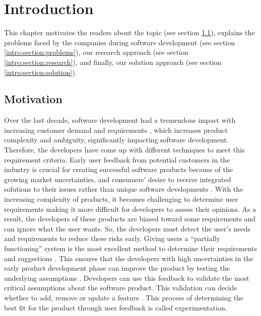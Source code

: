 \chapter{Introduction} \label{chap:intro}
This chapter motivates the readers about the topic (see section \ref{intro:section:motivation}), explains the problems faced by the companies during software development (see section \ref{intro:section:problems}), our research approach (see section \ref{intro:section:research}), and finally, our solution approach (see section \ref{intro:section:solution}).

\section{Motivation}
\label{intro:section:motivation}
Over the last decade, software development had a tremendous impact with increasing customer demand and requirements \cite{article:swdemand:ahmed}, which increases product complexity and ambiguity, significantly impacting software development.  
Therefore, the developers have come up with different techniques to meet this requirement criteria.
Early user feedback from potential customers in the industry is crucial for creating successful software products because of the growing market uncertainties, and consumers' desire to receive integrated solutions to their issues rather than unique software developments \cite{misc:businessmodels:teece}.
With the increasing complexity of products, it becomes challenging to determine user requirements making it more difficult for developers to assess their opinions.
As a result, the developers of these products are biased toward some requirements and can ignore what the user wants. 
So, the developers must detect the user's needs and requirements to reduce these risks early.
Giving users a ``partially functioning'' system is the most excellent method to determine their requirements and suggestions \cite{journal:prototyping:davis}.
This ensures that the developers with high uncertainties in the early product development phase can improve the product by testing the underlying assumptions \cite{misc:lean:steve}.
Developers can use this feedback to validate the most critical assumptions about the software product. 
This validation can decide whether to add, remove or update a feature \cite{article:experiments:lindgren}. 
This process of determining the best fit for the product through user feedback is called experimentation.
